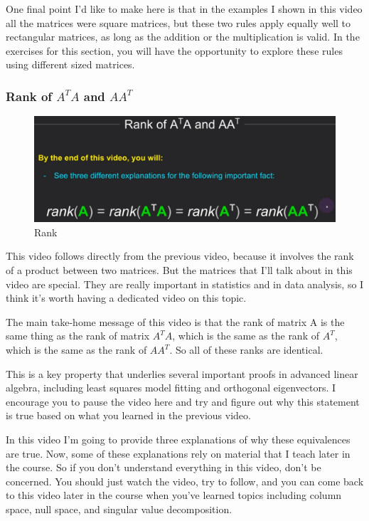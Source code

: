 \documentclass[fleqn,10pt]{olplainarticle}
\theoremstyle{definition}
\theoremstyle{remark}
\begin{document}
One final point I'd like to make here is that in the examples I shown in this video all the matrices were square matrices, but these two rules apply equally well to rectangular matrices, as long as the addition or the multiplication is valid. In the exercises for this section, you will have the opportunity to explore these rules using different sized matrices.

\pagebreak

\subsubsection*{Rank of $A^TA$ and $AA^T$}

\begin{figure}[ht]
	\centering
	\includegraphics[width=0.6\linewidth]{images/rank-22.png}
	\caption{Rank}
	\label{fig:rank_22}
\end{figure}

This video follows directly from the previous video, because it involves the rank of a product between two matrices. But the matrices that I'll talk about in this video are special. They are really important in statistics and in data analysis, so I think it's worth having a dedicated video on this topic.

The main take-home message of this video is that the rank of matrix A is the same thing as the rank of matrix $A^TA$, which is the same as the rank of $A^T$, which is the same as the rank of $AA^T$. So all of these ranks are identical.

This is a key property that underlies several important proofs in advanced linear algebra, including least squares model fitting and orthogonal eigenvectors. I encourage you to pause the video here and try and figure out why this statement is true based on what you learned in the previous video.

In this video I'm going to provide three explanations of why these equivalences are true. Now, some of these explanations rely on material that I teach later in the course. So if you don't understand everything in this video, don't be concerned. You should just watch the video, try to follow, and you can come back to this video later in the course when you've learned topics including column space, null space, and singular value decomposition.
\end{document}

